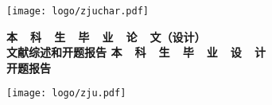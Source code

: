 \cleardoublepage{}

\hskip 40mm

\begin{center}
    \texttt{[image: logo/zjuchar.pdf]}
\end{center}

\begin{center}
     \heiti \bfseries
    {
        本~~科~~生~~毕~~业~~论~~文（设计）
        \\ \vskip 24pt
        文献综述和开题报告
    }
    {
        本~~科~~生~~毕~~业~~设~~计
        \\ \vskip 24pt
        开题报告
    }
\end{center}

\vskip 40pt

\begin{center}
    \texttt{[image: logo/zju.pdf]}
\end{center}


